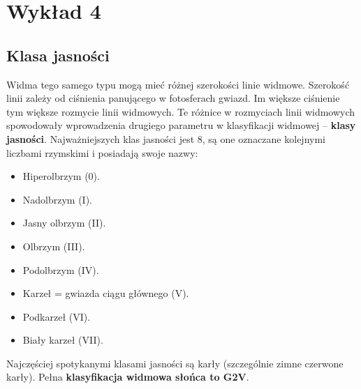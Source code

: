 \documentclass[../index.tex]{subfiles}
\begin{document}
    \section{Wykład 4}
        \subsection{Klasa jasności}
            Widma tego samego typu mogą mieć różnej szerokości linie widmowe. Szerokość linii zależy od ciśnienia panującego w fotosferach gwiazd. Im większe ciśnienie tym większe rozmycie linii widmowych. Te różnice w rozmyciach linii widmowych spowodowały wprowadzenia drugiego parametru w klasyfikacji widmowej \--- \textbf{klasy jasności}. Najważniejszych klas jasności jest 8, są one oznaczane kolejnymi liczbami rzymskimi i posiadają swoje nazwy:
            \begin{itemize}
                \item Hiperolbrzym (0).
                \item Nadolbrzym (I).
                \item Jasny olbrzym (II).
                \item Olbrzym (III).
                \item Podolbrzym (IV).
                \item Karzeł = gwiazda ciągu głównego (V).
                \item Podkarzeł (VI).
                \item Biały karzeł (VII).
            \end{itemize}
            Najczęściej spotykanymi klasami jasności są karły (szczególnie zimne czerwone karły). Pełna \textbf{klasyfikacja widmowa słońca to G2V}.
\end{document}
